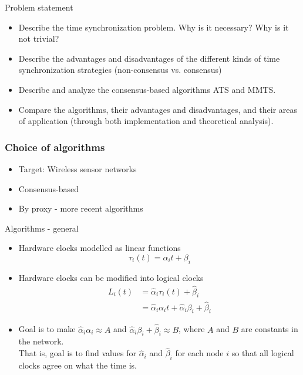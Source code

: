 \documentclass{beamer}
\begin{document}
\begin{frame}{Problem statement}
\begin{itemize}
    \item<1-> Describe the time synchronization problem. Why is it necessary? Why is it not trivial? 
    \item<2-> Describe the advantages and disadvantages of the different kinds of time synchronization strategies (non-consensus vs. consensus)
    \item<3-> Describe and analyze the consensus-based algorithms ATS and MMTS.
    \item<4-> Compare the algorithms, their advantages and disadvantages, and their areas of application (through both implementation and theoretical analysis).
\end{itemize}

\end{frame}
 
\begin{frame}
    \frametitle{Choice of algorithms}
    \begin{itemize}
        \item Target: Wireless sensor networks
        \item Consensus-based
        \item By proxy - more recent algorithms
    \end{itemize}
\end{frame}
 
\begin{frame}{Algorithms - general}
    \begin{itemize}
        \item Hardware clocks modelled as linear functions $$ \tau_i(t) = \alpha_i t + \beta_i $$
        \item Hardware clocks can be modified into logical clocks
        \begin{align*}
            L_i(t) &= \hat{\alpha}_i \tau_i(t) + \hat{\beta}_i \\
                    &= \hat{\alpha}_i \alpha_i t + \hat{\alpha}_i \beta_i + \hat{\beta}_i
        \end{align*}
        \item Goal is to make $\hat{\alpha}_i \alpha_i \approx A$ and $\hat{\alpha}_i \beta_i + \hat{\beta}_i \approx B$, where $A$ and $B$ are constants in the network.\\
        That is, goal is to find values for $\hat{\alpha}_i$ and $\hat{\beta}_i$ for each node $i$ so that all logical clocks agree on what the time is.
    \end{itemize}
\end{frame}
\end{document}
